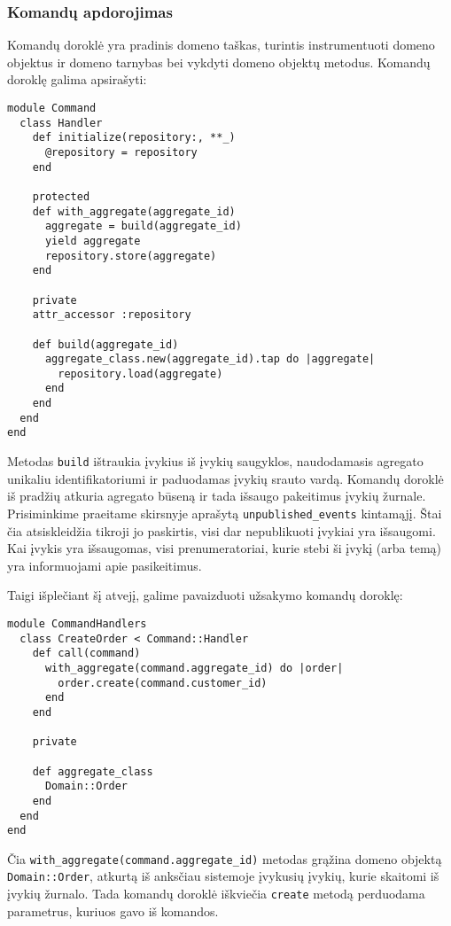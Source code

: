 \subsubsection{Komandų apdorojimas}

Komandų doroklė yra pradinis domeno taškas, turintis instrumentuoti domeno objektus ir domeno tarnybas bei vykdyti domeno objektų metodus. Komandų doroklę galima apsirašyti:

\begin{lstlisting}
module Command
  class Handler
    def initialize(repository:, **_)
      @repository = repository
    end

    protected
    def with_aggregate(aggregate_id)
      aggregate = build(aggregate_id)
      yield aggregate
      repository.store(aggregate)
    end

    private
    attr_accessor :repository

    def build(aggregate_id)
      aggregate_class.new(aggregate_id).tap do |aggregate|
        repository.load(aggregate)
      end
    end
  end
end
\end{lstlisting}

Metodas \lstinline|build| ištraukia įvykius iš įvykių saugyklos, naudodamasis agregato unikaliu identifikatoriumi ir paduodamas įvykių srauto vardą. Komandų doroklė iš pradžių atkuria agregato būseną ir tada išsaugo pakeitimus įvykių žurnale. Prisiminkime praeitame skirsnyje aprašytą \lstinline|unpublished_events| kintamąjį. Štai čia atsiskleidžia tikroji jo paskirtis, visi dar nepublikuoti įvykiai yra išsaugomi. Kai įvykis yra išsaugomas, visi prenumeratoriai, kurie stebi ši įvykį (arba temą) yra informuojami apie pasikeitimus.

Taigi išplečiant šį atvejį, galime pavaizduoti užsakymo komandų doroklę:

\begin{lstlisting}
module CommandHandlers
  class CreateOrder < Command::Handler
    def call(command)
      with_aggregate(command.aggregate_id) do |order|
        order.create(command.customer_id)
      end
    end

    private

    def aggregate_class
      Domain::Order
    end
  end
end
\end{lstlisting}

Čia \lstinline|with_aggregate(command.aggregate_id)| metodas grąžina domeno objektą \lstinline|Domain::Order|, atkurtą iš anksčiau sistemoje įvykusių įvykių, kurie skaitomi iš įvykių žurnalo. Tada komandų doroklė iškviečia \lstinline|create| metodą perduodama parametrus, kuriuos gavo iš komandos.

